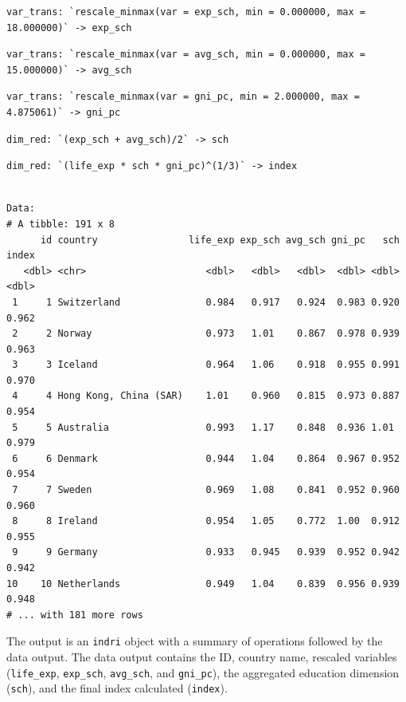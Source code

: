\documentclass[
]{article}
\begin{document}
\begin{verbatim}
var_trans: `rescale_minmax(var = exp_sch, min = 0.000000, max = 18.000000)` -> exp_sch
\end{verbatim}

\begin{verbatim}
var_trans: `rescale_minmax(var = avg_sch, min = 0.000000, max = 15.000000)` -> avg_sch
\end{verbatim}

\begin{verbatim}
var_trans: `rescale_minmax(var = gni_pc, min = 2.000000, max = 4.875061)` -> gni_pc
\end{verbatim}

\begin{verbatim}
dim_red: `(exp_sch + avg_sch)/2` -> sch
\end{verbatim}

\begin{verbatim}
dim_red: `(life_exp * sch * gni_pc)^(1/3)` -> index
\end{verbatim}

\begin{verbatim}

Data: 
# A tibble: 191 x 8
      id country                life_exp exp_sch avg_sch gni_pc   sch index
   <dbl> <chr>                     <dbl>   <dbl>   <dbl>  <dbl> <dbl> <dbl>
 1     1 Switzerland               0.984   0.917   0.924  0.983 0.920 0.962
 2     2 Norway                    0.973   1.01    0.867  0.978 0.939 0.963
 3     3 Iceland                   0.964   1.06    0.918  0.955 0.991 0.970
 4     4 Hong Kong, China (SAR)    1.01    0.960   0.815  0.973 0.887 0.954
 5     5 Australia                 0.993   1.17    0.848  0.936 1.01  0.979
 6     6 Denmark                   0.944   1.04    0.864  0.967 0.952 0.954
 7     7 Sweden                    0.969   1.08    0.841  0.952 0.960 0.960
 8     8 Ireland                   0.954   1.05    0.772  1.00  0.912 0.955
 9     9 Germany                   0.933   0.945   0.939  0.952 0.942 0.942
10    10 Netherlands               0.949   1.04    0.839  0.956 0.939 0.948
# ... with 181 more rows
\end{verbatim}

The output is an \texttt{indri} object with a summary of operations
followed by the data output. The data output contains the ID, country
name, rescaled variables (\texttt{life\_exp}, \texttt{exp\_sch},
\texttt{avg\_sch}, and \texttt{gni\_pc}), the aggregated education
dimension (\texttt{sch}), and the final index calculated
(\texttt{index}).
\end{document}
